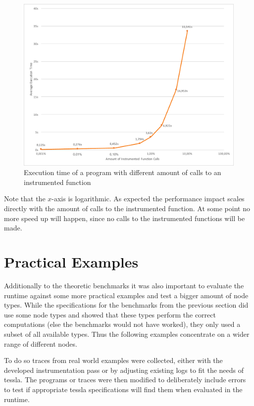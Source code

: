 \begin{figure}
  \includegraphics[width=\textwidth]{gfx/instrumentation_amount_benchmark}
  \caption{Execution time of a program with different amount of calls to an instrumented function}
\label{fig:chap_eval:instrument_benchmark_amount_results}
\end{figure}

Note that the \(x\)-axis is logarithmic.
As expected the performance impact scales directly with the amount of calls to the instrumented function.
At some point no more speed up will happen, since no calls to the instrumented functions will be made.

\section{Practical Examples}
\label{sec:evaluation:runtime_examples}

Additionally to the theoretic benchmarks it was also important to evaluate the runtime against some more practical examples and test a bigger amount of node types.
While the specifications for the benchmarks from the previous section did use some node types and showed that these types perform the correct computations (else the benchmarks would not have worked), they only used a subset of all available types.
Thus the following examples concentrate on a wider range of different nodes.

To do so traces from real world examples were collected, either with the developed instrumentation pass or by adjusting existing logs to fit the needs of \gls{tessla}.
The programs or traces were then modified to deliberately include errors to test if appropriate \gls{tessla} specifications will find them when evaluated in the runtime.

